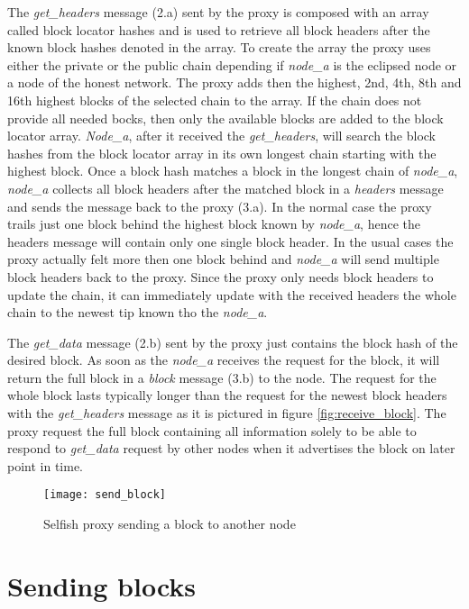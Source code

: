 The \textit{get\_headers} message (2.a) sent by the proxy is composed with an array called block locator hashes and is used to retrieve all block headers after the known block hashes denoted in the array.
To create the array the proxy uses either the private or the public chain depending if \textit{node\_a} is the eclipsed node or a node of the honest network.
The proxy adds then the highest, 2nd, 4th, 8th and 16th highest blocks of the selected chain to the array.
If the chain does not provide all needed bocks, then only the available blocks are added to the block locator array.
\textit{Node\_a}, after it received the \textit{get\_headers}, will search the block hashes from the block locator array in its own longest chain starting with the highest block.
Once a block hash matches a block in the longest chain of \textit{node\_a}, \textit{node\_a} collects all block headers after the matched block in a \textit{headers} message and sends the message back to the proxy (3.a).
In the normal case the proxy trails just one block behind the highest block known by \textit{node\_a}, hence the headers message will contain only one single block header.
In the usual cases the proxy actually felt more then one block behind and \textit{node\_a} will send multiple block headers back to the proxy.
Since the proxy only needs block headers to update the chain, it can immediately update with the received headers the whole chain to the newest tip known tho the \textit{node\_a}.

The \textit{get\_data} message (2.b) sent by the proxy just contains the block hash of the desired block.
As soon as the \textit{node\_a} receives the request for the block, it will return the full block in a \textit{block} message (3.b) to the node.
The request for the whole block lasts typically longer than the request for the newest block headers with the \textit{get\_headers} message as it is pictured in figure \ref{fig:receive_block}.
The proxy request the full block containing all information solely to be able to respond to \textit{get\_data} request by other nodes when it advertises the block on later point in time.

\begin{figure}
	\centering
    \texttt{[image: send\_block]}
    \caption{Selfish proxy sending a block to another node}
    \label{fig:send_block}
\end{figure}

\section{Sending blocks}
\label{chap:sending_blocks}


